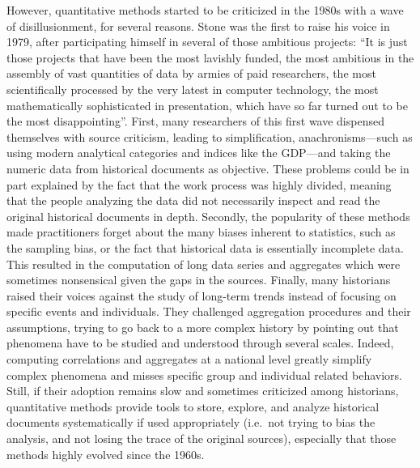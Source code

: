 However, quantitative methods started to be criticized in the 1980s with a wave of disillusionment, for several reasons.
Stone was the first to raise his voice in 1979, after participating himself in several of those ambitious projects: ``It is just those projects that have been the most lavishly funded, the most ambitious in the assembly of vast quantities of data by armies of paid researchers, the most scientifically processed by the very latest in computer technology, the most mathematically sophisticated in presentation, which have so far turned out to be the most disappointing''\cite{stoneRevivalNarrativeReflections1979}.
First, many researchers of this first wave dispensed themselves with source criticism, leading to simplification, anachronisms---such as using modern analytical categories and indices like the GDP---and taking the numeric data from historical documents as objective.
These problems could be in part explained by the fact that the work process was highly divided, meaning that the people analyzing the data did not necessarily inspect and read the original historical documents in depth.
Secondly, the popularity of these methods made practitioners forget about the many biases inherent to statistics, such as the sampling bias, or the fact that historical data is essentially incomplete data.
This resulted in the computation of long data series and aggregates which were sometimes nonsensical given the gaps in the sources\cite{lemercierQuantitativeMethodsHumanities2019}.
Finally, many historians raised their voices against the study of long-term trends instead of focusing on specific events and individuals.
They challenged aggregation procedures and their assumptions, trying to go back to a more complex history by pointing out that phenomena have to be studied and understood through several scales\cite{trivellatoThereFutureItalian2011}.
Indeed, computing correlations and aggregates at a national level greatly simplify complex phenomena and misses specific group and individual related behaviors.
Still, if their adoption remains slow and sometimes criticized among historians, quantitative methods provide tools to store, explore, and analyze historical documents systematically if used appropriately (i.e.\ not trying to bias the analysis, and not losing the trace of the original sources), especially that those methods highly evolved since the 1960s.



